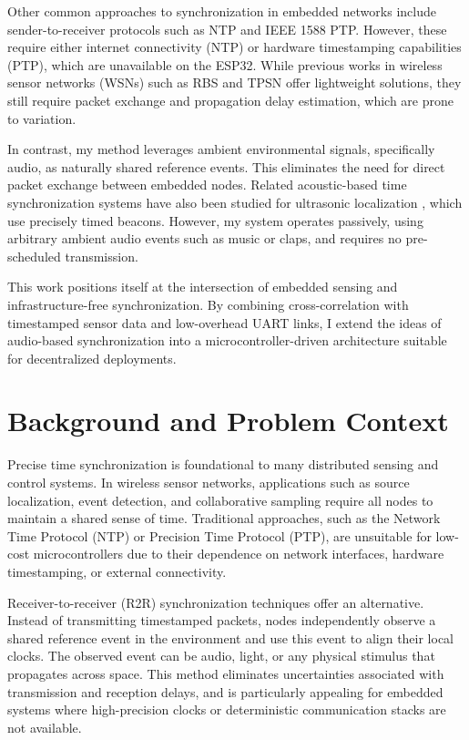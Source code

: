 \documentclass[sigconf]{acmart}
\begin{document}
Other common approaches to synchronization in embedded networks include sender-to-receiver protocols such as NTP and IEEE 1588 PTP. However, these require either internet connectivity (NTP) or hardware timestamping capabilities (PTP), which are unavailable on the ESP32. While previous works in wireless sensor networks (WSNs) such as RBS \cite{elson2002fine} and TPSN \cite{ganeriwal2003timing} offer lightweight solutions, they still require packet exchange and propagation delay estimation, which are prone to variation.

In contrast, my method leverages ambient environmental signals, specifically audio, as naturally shared reference events. This eliminates the need for direct packet exchange between embedded nodes. Related acoustic-based time synchronization systems have also been studied for ultrasonic localization \cite{lazik2015ultrasonic}, which use precisely timed beacons. However, my system operates passively, using arbitrary ambient audio events such as music or claps, and requires no pre-scheduled transmission.

This work positions itself at the intersection of embedded sensing and infrastructure-free synchronization. By combining cross-correlation with timestamped sensor data and low-overhead UART links, I extend the ideas of audio-based synchronization into a microcontroller-driven architecture suitable for decentralized deployments.

\section{Background and Problem Context}

Precise time synchronization is foundational to many distributed sensing and control systems. In wireless sensor networks, applications such as source localization, event detection, and collaborative sampling require all nodes to maintain a shared sense of time. Traditional approaches, such as the Network Time Protocol (NTP) or Precision Time Protocol (PTP), are unsuitable for low-cost microcontrollers due to their dependence on network interfaces, hardware timestamping, or external connectivity.

Receiver-to-receiver (R2R) synchronization techniques offer an alternative. Instead of transmitting timestamped packets, nodes independently observe a shared reference event in the environment and use this event to align their local clocks. The observed event can be audio, light, or any physical stimulus that propagates across space. This method eliminates uncertainties associated with transmission and reception delays, and is particularly appealing for embedded systems where high-precision clocks or deterministic communication stacks are not available.
\end{document}
